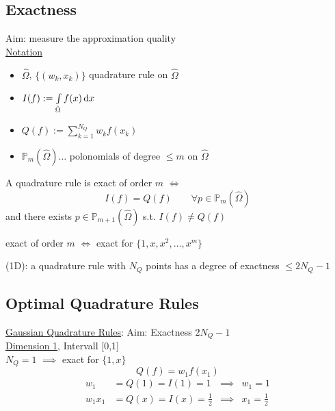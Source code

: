 \subsection{Exactness}
Aim: measure the approximation quality\\
\underline{Notation}
\begin{itemize}
	\item $\hat{\Omega}$, $\{(w_k,x_k)\}$ quadrature rule on $\hat{\Omega}$
	\item $I(f):= \int \limits_{\hat{\Omega}} f(x) \mathop{}\!\mathrm{d} x$
	\item $Q(f):= \displaystyle \sum_{k=1}^{N_Q} w_k f(x_k)$
	\item $\mathbb{P}_m(\hat{\Omega}) \dots $ polonomials of degree $\leq m$ on $\hat{\Omega}$
\end{itemize}
\begin{definition}
	A quadrature rule is exact of order $m$ $\iff$
	\begin{equation*}
		I(f)= Q(f) \qquad \forall p\in \mathbb{P}_m(\hat{\Omega})
	\end{equation*}
	and there exists $p\in \mathbb{P}_{m+1}(\hat{\Omega})$ s.t. $I(f)\neq Q(f)$
\end{definition}
\begin{lemma_}
	exact of order $m$ $\iff$ exact for $\{1,x,x^2,\dots,x^m \}$
\end{lemma_}

\begin{thrm}
	(1D): a quadrature rule with $N_Q$ points has a degree of exactness $\leq 2N_Q -1$
\end{thrm}

\subsection{Optimal Quadrature Rules}
\underline{Gaussian Quadrature Rules}: Aim: Exactness $2N_Q-1$
\vspace{0.5cm}\\
\underline{Dimension 1}, Intervall [0,1]\\
$N_Q = 1$ $\implies$ exact for $\{1,x\}$
\begin{equation*}
	Q(f)= w_1f(x_1)
\end{equation*}
\begin{align*}
	w_1 &= Q(1) = I(1)= 1 &\implies & w_1 = 1\\
	w_1x_1 &= Q(x) = I(x)= \frac{1}{2} &\implies & x_1 = \frac{1}{2}
\end{align*}

